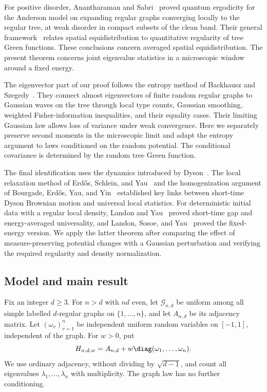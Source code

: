 For positive disorder, Anantharaman and
Sabri~\cite{AnantharamanSabri2017} proved quantum ergodicity for the
Anderson model on expanding regular graphs converging locally to the
regular tree, at weak disorder in compact subsets of the clean band.
Their general framework~\cite{AnantharamanSabri2019} relates spatial
equidistribution to quantitative regularity of tree Green functions.
These conclusions concern averaged spatial equidistribution.  The
present theorem concerns joint eigenvalue statistics in a microscopic
window around a fixed energy.

The eigenvector part of our proof follows the entropy method of
Backhausz and Szegedy~\cite{BackhauszSzegedy2019}.  They connect almost
eigenvectors of finite random regular graphs to Gaussian waves on the
tree through local type counts, Gaussian smoothing, weighted
Fisher-information inequalities, and their equality cases.  Their
limiting Gaussian law allows loss of variance under weak convergence.
Here we separately preserve second moments in the microscopic limit
and adapt the entropy argument to laws conditioned on the random
potential.  The conditional covariance is determined by the random tree Green
function.

The final identification uses the dynamics introduced by
Dyson~\cite{Dyson1962}.  The local relaxation method of Erd\H{o}s,
Schlein, and Yau~\cite{ESY2011} and the homogenization argument of
Bourgade, Erd\H{o}s, Yau, and Yin~\cite{BEYY2016} established key links
between short-time Dyson Brownian motion and universal local statistics.
For deterministic initial data with a regular local density, Landon and
Yau~\cite{LandonYau2017} proved short-time gap and energy-averaged
universality, and Landon, Sosoe, and Yau~\cite{LSY2019} proved the
fixed-energy version.  We apply the latter theorem after comparing
the effect of measure-preserving potential changes with a Gaussian
perturbation and verifying the required regularity and density
normalization.

\subsection{Model and main result}

Fix an integer $d\ge3$.  For $n>d$ with $nd$ even, let
$\mathcal G_{n,d}$ be uniform among all simple labelled $d$-regular
graphs on $\{1,\ldots,n\}$, and let $A_{n,d}$ be its adjacency matrix.
Let $(\omega_v)_{v=1}^n$ be independent uniform random variables on
$[-1,1]$, independent of the graph.  For $w>0$, put
\[
 H_{n,d,w}=A_{n,d}+w\diag(\omega_1,\ldots,\omega_n).
\]
We use ordinary adjacency, without dividing by $\sqrt{d-1}$, and count
all eigenvalues $\lambda_1,\ldots,\lambda_n$ with multiplicity.
The graph law has no further conditioning.

